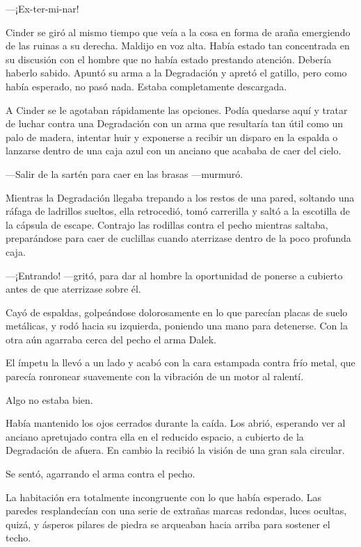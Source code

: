 —¡Ex-ter-mi-nar! 

Cinder se giró al mismo tiempo que veía a la cosa en forma de araña emergiendo de las ruinas a su derecha. Maldijo en voz alta. Había estado tan concentrada en su discusión con el hombre que no había estado prestando atención. Debería haberlo sabido. Apuntó su arma a la Degradación y apretó el gatillo, pero como había esperado, no pasó nada. Estaba completamente descargada. 

A Cinder se le agotaban rápidamente las opciones. Podía quedarse aquí y tratar de luchar contra una Degradación con un arma que resultaría tan útil como un palo de madera, intentar huir y exponerse a recibir un disparo en la espalda o lanzarse dentro de una caja azul con un anciano que acababa de caer del cielo. 



—Salir de la sartén para caer en las brasas —murmuró. 



Mientras la Degradación llegaba trepando a los restos de una pared, soltando una ráfaga de ladrillos sueltos, ella retrocedió, tomó carrerilla y saltó a la escotilla de la cápsula de escape. Contrajo las rodillas contra el pecho mientras saltaba, preparándose para caer de cuclillas cuando aterrizase dentro de la poco profunda caja. 



—¡Entrando! —gritó, para dar al hombre la oportunidad de ponerse a cubierto antes de que aterrizase sobre él. 



Cayó de espaldas, golpeándose dolorosamente en lo que parecían placas de suelo metálicas, y rodó hacia su izquierda, poniendo una mano para detenerse. Con la otra aún agarraba cerca del pecho el arma Dalek. 

El ímpetu la llevó a un lado y acabó con la cara estampada contra frío metal, que parecía ronronear suavemente con la vibración de un motor al ralentí. 

Algo no estaba bien. 

Había mantenido los ojos cerrados durante la caída. Los abrió, esperando ver al anciano apretujado contra ella en el reducido espacio, a cubierto de la Degradación de afuera. En cambio la recibió la visión de una gran sala circular. 

Se sentó, agarrando el arma contra el pecho. 

La habitación era totalmente incongruente con lo que había esperado. Las paredes resplandecían con una serie de extrañas marcas redondas, luces ocultas, quizá, y ásperos pilares de piedra se arqueaban hacia arriba para sostener el techo. 

